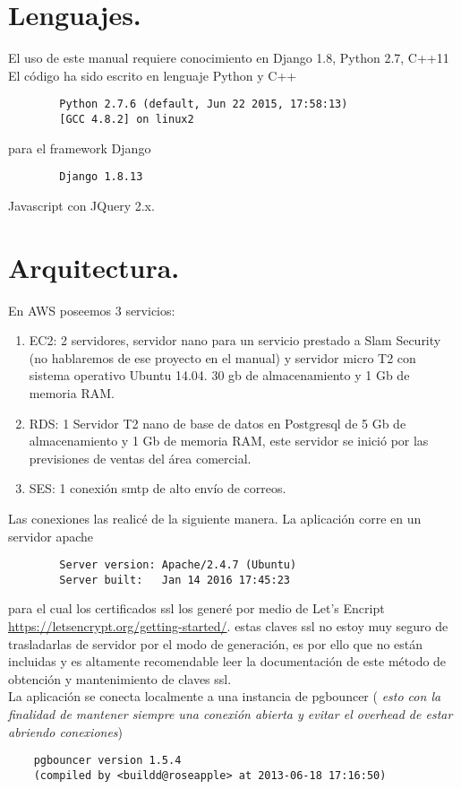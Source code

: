 \documentclass[10pt,a4paper]{book}
\begin{document}
	
	\section{Lenguajes.}
	El uso de este manual requiere conocimiento en Django 1.8, Python 2.7, C++11
	El código ha sido escrito en lenguaje Python y C++
	\begin{verbatim}
		Python 2.7.6 (default, Jun 22 2015, 17:58:13) 
		[GCC 4.8.2] on linux2
	\end{verbatim}
	para el framework Django 
	\begin{verbatim}
		Django 1.8.13
	\end{verbatim}
	Javascript con JQuery 2.x.
	
	\section{Arquitectura.}
	En AWS poseemos 3 servicios:
	\begin{enumerate}
		\item EC2: 2 servidores, servidor nano para un servicio prestado a Slam Security (no hablaremos de ese proyecto en el manual) y servidor micro T2 con sistema operativo Ubuntu 14.04. 30 gb de almacenamiento y 1 Gb de memoria RAM.
		\item RDS: 1 Servidor T2 nano de base de datos en Postgresql de 5 Gb de almacenamiento y 1 Gb de memoria RAM, este servidor se inició por las previsiones de ventas del área comercial.
		\item SES: 1 conexión smtp de alto envío de correos.
	\end{enumerate}
	
	Las conexiones las realicé de la siguiente manera. La aplicación corre en un servidor apache
	\begin{verbatim}
		Server version: Apache/2.4.7 (Ubuntu)
		Server built:   Jan 14 2016 17:45:23
	\end{verbatim}
	para el cual los certificados ssl los generé por medio de Let's Encript \url{https://letsencrypt.org/getting-started/}. estas claves ssl no estoy muy seguro de trasladarlas de servidor por el modo de generación, es por ello que no están incluidas y es altamente recomendable leer la documentación de este método de obtención  y mantenimiento de claves ssl.\\
	
	La aplicación se conecta localmente a una instancia de pgbouncer ( \textit{esto con la finalidad de mantener siempre una conexión abierta y evitar el overhead de estar abriendo conexiones})
	\begin{verbatim}
	pgbouncer version 1.5.4
	(compiled by <buildd@roseapple> at 2013-06-18 17:16:50)
	\end{verbatim}
	
\end{document}
